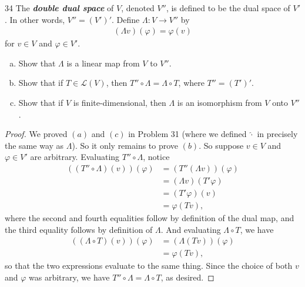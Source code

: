 \documentclass{extarticle}
\newenvironment{problem}[1]{\begin{prob*}{#1}{}}{\end{prob*}}
\newcommand{\Hom}{\mathcal{L}}
\begin{document}
\begin{problem}{34}
The \textbf{\textit{double dual space}} of $V$, denoted $V''$, is defined to be the dual space of $V'$.  In other words, $V'' = (V')'$.  Define $\Lambda:V\to V''$ by
\begin{align*}
(\Lambda v)(\varphi)=\varphi(v)
\end{align*}
for $v\in V$ and $\varphi\in V'$.  
\begin{enumerate}[(a)]
\item Show that $\Lambda$ is a linear map from $V$ to $V''$.
\item Show that if $T\in\Hom(V)$, then $T''\circ\Lambda = \Lambda\circ T$, where $T'' = (T')'$.
\item Show that if $V$ is finite-dimensional, then $\Lambda$ is an isomorphism from $V$ onto $V''$.
\end{enumerate}
\end{problem}
\begin{proof}
We proved $(a)$ and $(c)$ in Problem 31 (where we defined $\hat{\cdot}$ in precisely the same way as $\Lambda$).  So it only remains to prove $(b)$.  So suppose $v\in V$ and $\varphi\in V'$ are arbitrary.  Evaluating $T''\circ\Lambda$, notice
\begin{align*}
((T''\circ\Lambda)(v))(\varphi) &= (T''(\Lambda v))(\varphi)\\
&= (\Lambda v)(T'\varphi)\\
&= (T'\varphi)(v)\\
&= \varphi(Tv),
\end{align*}
where the second and fourth equalities follow by definition of the dual map, and the third equality follows by definition of $\Lambda$.  And evaluating $\Lambda\circ T$, we have
\begin{align*}
((\Lambda\circ T)(v))(\varphi) &= (\Lambda(Tv))(\varphi)\\
&= \varphi(Tv),
\end{align*}
so that the two expressions evaluate to the same thing.  Since the choice of both $v$ and $\varphi$ was arbitrary, we have $T''\circ\Lambda = \Lambda\circ T$, as desired.
\end{proof}
\end{document}

